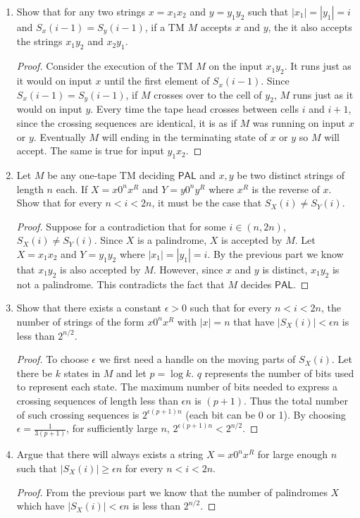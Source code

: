 \documentclass[11pt]{article}
\def\PAL{\mathsf{PAL}}
\begin{document}
\begin{enumerate}
\item Show that for any two strings $x = x_1x_2$ and $y=y_1y_2$ such that $|x_1|=|y_1| = i$ and $S_x(i-1) = S_y(i-1)$, if a TM $M$ accepts $x$ and $y$, the it also accepts the strings $x_1y_2$ and $x_2y_1$.  
\begin{proof}
Consider the execution of the TM $M$ on the input $x_1y_2$. It runs just as it would on input $x$ until the first element of $S_x(i-1)$. Since $S_x(i-1) = S_y(i-1)$, if $M$ crosses over to the cell of $y_2$, $M$ runs just as it would on input $y$. Every time the tape head crosses between cells $i$ and $i+1$, since the crossing sequences are identical, it is as if $M$ was running on input $x$ or $y$. Eventually $M$ will ending in the terminating state of $x$ or $y$ so $M$ will accept. The same is true for input $y_1x_2$. 
\end{proof}
\item Let $M$ be any one-tape TM deciding $\PAL$ and $x, y$ be two distinct strings of length $n$ each. If $X = x0^nx^R$ and $Y = y0^ny^R$ where $x^R$ is the reverse of $x$. Show that for every $n < i < 2n$, it must be the case that $S_X(i) \neq S_Y(i)$.
\begin{proof}
Suppose for a contradiction that for some $i \in (n, 2n)$, $S_X(i) \neq S_Y(i)$. Since $X$ is a palindrome, $X$ is accepted by $M$. Let $X = x_1x_2$ and $Y = y_1y_2$ where $|x_1| = |y_1| = i$. By the previous part we know that $x_1y_2$ is also accepted by $M$. However, since $x$ and $y$ is distinct, $x_1y_2$ is not a palindrome. This contradicts the fact that $M$ decides $\PAL$.  
\end{proof}
\item Show that there exists a constant $\epsilon > 0$ such that for every $n < i < 2n$, the number of strings of the form $x0^nx^R$ with $|x| = n$ that have $|S_X(i)| < \epsilon n$ is less than $2^{n/2}$.
\begin{proof}
To choose $\epsilon$ we first need a handle on the moving parts of $S_X(i)$. Let there be $k$ states in $M$ and let $p = \log k$. $q$ represents the number of bits used to represent each state. The maximum number of bits needed to express a crossing sequences of length less than $\epsilon n$ is $(p+1)$. Thus the total number of such crossing sequences is $2^{\epsilon (p+1)n}$ (each bit can be 0 or 1). By choosing $\epsilon = \frac{1}{3(p+1)}$, for sufficiently large $n$, $2^{\epsilon (p+1)n} < 2^{n/2}$.
\end{proof}
\item Argue that there will always exists a string $X = x0^nx^R$ for large enough $n$ such that $|S_X(i)| \geq \epsilon n$ for every $n < i < 2n$. 
\begin{proof}
From the previous part we know that the number of palindromes $X$ which have $|S_X(i)| < \epsilon n$ is less than $2^{n/2}$. 
\end{proof}
\end{enumerate}
\end{document}

